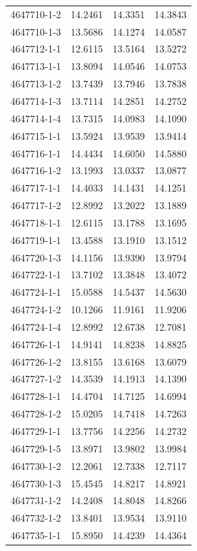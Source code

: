 \begin{longtable}{lrrr}
4647710-1-2 & 14.2461 & 14.3351 & 14.3843 \\
4647710-1-3 & 13.5686 & 14.1274 & 14.0587 \\
4647712-1-1 & 12.6115 & 13.5164 & 13.5272 \\
4647713-1-1 & 13.8094 & 14.0546 & 14.0753 \\
4647713-1-2 & 13.7439 & 13.7946 & 13.7838 \\
4647714-1-3 & 13.7114 & 14.2851 & 14.2752 \\
4647714-1-4 & 13.7315 & 14.0983 & 14.1090 \\
4647715-1-1 & 13.5924 & 13.9539 & 13.9414 \\
4647716-1-1 & 14.4434 & 14.6050 & 14.5880 \\
4647716-1-2 & 13.1993 & 13.0337 & 13.0877 \\
4647717-1-1 & 14.4033 & 14.1431 & 14.1251 \\
4647717-1-2 & 12.8992 & 13.2022 & 13.1889 \\
4647718-1-1 & 12.6115 & 13.1788 & 13.1695 \\
4647719-1-1 & 13.4588 & 13.1910 & 13.1512 \\
4647720-1-3 & 14.1156 & 13.9390 & 13.9794 \\
4647722-1-1 & 13.7102 & 13.3848 & 13.4072 \\
4647724-1-1 & 15.0588 & 14.5437 & 14.5630 \\
4647724-1-2 & 10.1266 & 11.9161 & 11.9206 \\
4647724-1-4 & 12.8992 & 12.6738 & 12.7081 \\
4647726-1-1 & 14.9141 & 14.8238 & 14.8825 \\
4647726-1-2 & 13.8155 & 13.6168 & 13.6079 \\
4647727-1-2 & 14.3539 & 14.1913 & 14.1390 \\
4647728-1-1 & 14.4704 & 14.7125 & 14.6994 \\
4647728-1-2 & 15.0205 & 14.7418 & 14.7263 \\
4647729-1-1 & 13.7756 & 14.2256 & 14.2732 \\
4647729-1-5 & 13.8971 & 13.9802 & 13.9984 \\
4647730-1-2 & 12.2061 & 12.7338 & 12.7117 \\
4647730-1-3 & 15.4545 & 14.8217 & 14.8921 \\
4647731-1-2 & 14.2408 & 14.8048 & 14.8266 \\
4647732-1-2 & 13.8401 & 13.9534 & 13.9110 \\
4647735-1-1 & 15.8950 & 14.4239 & 14.4364 \\

\end{longtable}
